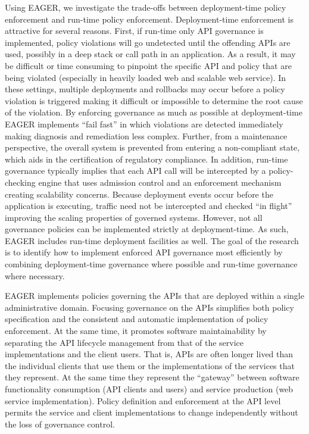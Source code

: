 Using EAGER, we investigate the trade-offs between deployment-time policy
enforcement and run-time policy enforcement.
Deployment-time enforcement is attractive for several
reasons.  First, if run-time only API governance is implemented, 
policy violations will go undetected until the offending APIs are used,
possibly in a deep stack or call path in an application.  
As a result, it may be difficult or time consuming to pinpoint the specific
API and policy that are being violated (especially in heavily loaded web and
scalable web service).
In these settings, multiple deployments and rollbacks may occur before a policy
violation is triggered making it difficult or impossible to determine the root
cause of the violation.  By enforcing governance as much as possible
at deployment-time
EAGER implements ``fail fast'' in which violations are detected
immediately making diagnosis and remediation less complex.  
Further, from a maintenance perspective,  the overall
system is prevented from entering a non-compliant state, which aids in the
certification of regulatory compliance.  In addition, run-time governance
typically implies that each API call will be intercepted by a policy-checking engine
that uses admission control and an enforcement mechanism creating scalability
concerns.  Because deployment
events occur before the application is executing,
traffic need not be intercepted and checked ``in flight''
improving the
scaling properties of governed systems.  However, not all governance policies can be
implemented strictly at deployment-time.  As such, EAGER includes run-time
deployment facilities as well.  The goal of the research is to identify how to
implement enforced API governance most efficiently by combining deployment-time  
governance where possible and run-time governance where necessary.


EAGER implements policies governing the APIs that are 
deployed within a single administrative domain.  Focusing governance on
the APIs simplifies both policy specification and the consistent
and automatic implementation of policy enforcement.  At the same time, it promotes
software maintainability by separating the API lifecycle management from that
of the service implementations and the client users.  That is, APIs are often
longer lived than the individual clients that use them or the implementations
of the services that they represent.  At the same time they represent the
``gateway'' between software functionality consumption 
(API clients and users) and service
production (web service implementation).  Policy definition and enforcement at
the API level permits the service and client implementations to change
independently without the loss of governance control.

